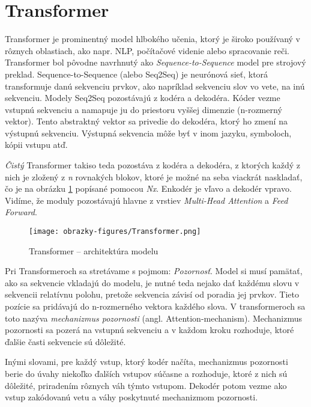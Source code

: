 \section{Transformer}

Transformer \cite{Vaswani:2017} je prominentný model hlbokého učenia, ktorý je široko používaný v rôznych oblastiach, ako napr. NLP, počítačové videnie alebo spracovanie reči.
Transformer bol pôvodne navrhnutý ako \textit{Sequence-to-Sequence} model pre strojový preklad. Sequence-to-Sequence (alebo Seq2Seq) je neurónová sieť, ktorá transformuje danú sekvenciu prvkov, ako napríklad sekvenciu slov vo vete, na inú sekvenciu. Modely Seq2Seq pozostávajú z kodéra a dekodéra. Kóder vezme vstupnú sekvenciu a namapuje ju do priestoru vyššej dimenzie (n-rozmerný vektor). Tento abstraktný vektor sa privedie do dekodéra, ktorý ho zmení na výstupnú sekvenciu. Výstupná sekvencia môže byť v inom jazyku, symboloch, kópii vstupu atď.

\textit{Čistý} Transformer takiso teda pozostáva z kodéra a dekodéra, z ktorých každý z nich je zložený z \textit{n} rovnakých blokov, ktoré je možné na seba viackrát naskladať, čo je na obrázku \ref{transformer} popísané pomocou \textit{Nx}. Enkodér je vľavo a dekodér vpravo. Vidíme, že moduly pozostávajú hlavne z vrstiev \textit{Multi-Head Attention} a \textit{Feed Forward}.

\begin{figure}[ht!]
	\centering
	\texttt{[image: obrazky-figures/Transformer.png]}
	\caption{Transformer -- architektúra modelu \cite{Vaswani:2017}}
	\label{transformer}
\end{figure}

Pri Transformeroch sa stretávame s pojmom: \textit{Pozornosť}. Model si musí pamätať, ako sa sekvencie vkladajú do modelu, je nutné teda nejako dať každému slovu v sekvencii relatívnu polohu, pretože sekvencia závisí od poradia jej prvkov. Tieto pozície sa pridávajú do n-rozmerného vektora každého slova. V transformeroch sa toto nazýva \textit{mechanizmus pozornosti} (angl. Attention-mechanism). Mechanizmus pozornosti sa pozerá na vstupnú sekvenciu a v každom kroku rozhoduje, ktoré ďalšie časti sekvencie sú dôležité.

Inými slovami, pre každý vstup, ktorý kodér načíta, mechanizmus pozornosti berie do úvahy niekoľko ďalších vstupov súčasne a rozhoduje, ktoré z nich sú dôležité, priradením rôznych váh týmto vstupom. Dekodér potom vezme ako vstup zakódovanú vetu a váhy poskytnuté mechanizmom pozornosti.


